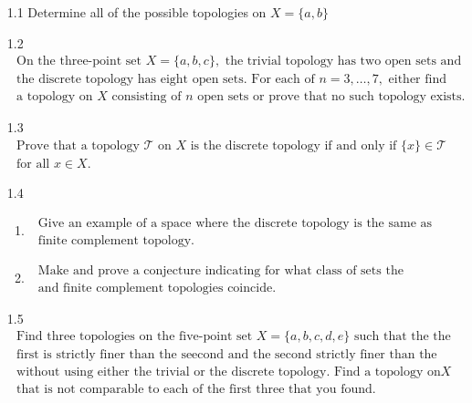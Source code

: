 \documentclass[12pt]{article}
\begin{document}
\begin{enumerate}
	\item[1.1] Determine all of the possible topologies on  $ X =\{a,b\}$
	
	\item[1.2]$  \begin{array} { l } { \text { On the three-point set } X = \{ a , b , c \} , \text { the trivial topology has two open sets and } } \\ { \text { the discrete topology has eight open sets. For each of } n = 3 , \ldots , 7 , \text { either find } } \\ { \text { a topology on } X \text { consisting of } n \text { open sets or prove that no such topology exists. } } \end{array} $
	
	\item[1.3]$  \begin{array} { l } { \text { Prove that a topology } \mathcal { T } \text { on } X \text { is the discrete topology if and only if } \{ x \} \in \mathcal { T } } \\ { \text { for all } x \in X . } \end{array} $
	
	\item[1.4] \begin{enumerate}
				\item $ \begin{array} { l } { \text { Give an example of a space where the discrete topology is the same as the } } \\ { \text { finite complement topology. } } \end{array} $
				\item$  \begin{array} { l } { \text { Make and prove a conjecture indicating for what class of sets the discrete } } \\ { \text { and finite complement topologies coincide. } } \end{array}$
			\end{enumerate}
	
	\item[1.5] $ \begin{array} { l } { \text { Find three topologies on the five-point set } X = \{ a , b , c , d , e \} \text { such that the the } } \\ { \text { first is strictly finer than the seecond and the second strictly finer than the third, } } \\ { \text { without using either the trivial or the discrete topology. Find a topology on } X } \\ { \text { that is not comparable to each of the first three that you found. } } \end{array} $
	

\end{enumerate}
\end{document}
